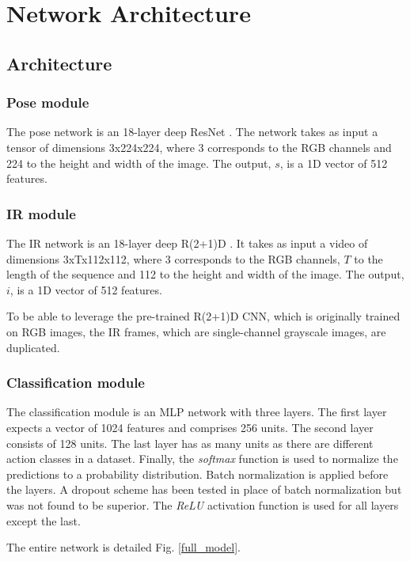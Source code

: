 \documentclass[letterpaper, 10 pt, conference]{ieeeconf}
\begin{document}
\section{Network Architecture}
\subsection{Architecture}

\subsubsection{Pose module}

The pose network is an 18-layer deep ResNet \cite{he2016deep}. The network takes as input a tensor of dimensions 3x224x224, where 3 corresponds to the RGB channels and 224 to the height and width of the image. The output, $s$, is a 1D vector of 512 features.

\subsubsection{IR module}

The IR network is an 18-layer deep R(2+1)D \cite{tran2018closer}. It takes as input a video of dimensions 3xTx112x112, where 3 corresponds to the RGB channels, $T$ to the length of the sequence and 112 to the height and width of the image. The output, $i$, is a 1D vector of 512 features. 

To be able to leverage the pre-trained R(2+1)D CNN, which is originally trained on RGB images, the IR frames, which are single-channel grayscale images, are duplicated.

\subsubsection{Classification module}

The classification module is an MLP network with three layers. The first layer expects a vector of 1024 features and comprises 256 units. The second layer consists of 128 units. The last layer has as many units as there are different action classes in a dataset. Finally, the \textit{softmax} function is used to normalize the predictions to a probability distribution. Batch normalization is applied before the layers. A dropout scheme has been tested in place of batch normalization but was not found to be superior. The \textit{ReLU} activation function is used for all layers except the last.

The entire network is detailed Fig. \ref{full_model}.
\end{document}
